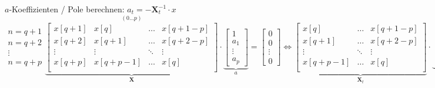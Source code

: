 	\renewcommand{\arraystretch}{1.0}
	\begin{aufzaehlung}
  		\item $a$-Koeffizienten / Pole berechnen: $a_t = - \bm X_t^{-1} \cdot x$  \small $$
		\begin{matrix} n=q+1\\ n=q+2\\ \vdots \\ n=q+p \end{matrix}
		\overset{(0 \hdots p)}{\underbrace{\begin{bmatrix}
    		x[q+1] & x[q] & \hdots & x[q+1-p] \\                                   
    		x[q+2] & x[q+1] & \hdots & x[q+2-p] \\
    		\vdots & \vdots & \ddots & \vdots \\                             
    		x[q+p] & x[q+p-1] & \hdots & x[q] \\
		\end{bmatrix}  }_{\bm X}} \cdot \underbrace{\begin{bmatrix}
    		1 \\
    		a_1 \\
    		\vdots \\
    		a_p
		\end{bmatrix}  }_{a} = \begin{bmatrix}
    		0 \\
    		0 \\
    		\vdots \\
    		0
		\end{bmatrix} \Longleftrightarrow 
		\underbrace{ \begin{bmatrix}
    		x[q] &  \hdots & x[q+1-p] \\                                   
    		x[q+1] & \hdots & x[q+2-p] \\
    		\vdots & \ddots & \vdots \\                             
    		x[q+p-1] & \hdots & x[q] \\
		\end{bmatrix}  
		}_{\bm  X_t} \cdot 
		\underbrace{\begin{bmatrix}
    		a_1 \\
    		a_2 \\
    		\vdots \\
    		a_p
		\end{bmatrix}  }_{a_t} = \underbrace{\begin{bmatrix}
    		-x [q+1]\\            
    		-x [q+2]\\
    		\vdots \\
    		-x [q+p]\\
		\end{bmatrix}}_{x} $$  \normalsize
		

\end{aufzaehlung}
